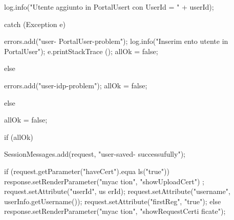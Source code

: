 \begin{DoxyCode}
{{{{{{{                                                                log.info("Utente 
      aggiunto in PortalUsert con UserId = "
                                                                                +
       userId);

                                                        } catch (Exception e) {

                                                                errors.add("user-
      PortalUser-problem");
                                                                log.info("Inserim
      ento utente in PortalUser");
                                                                e.printStackTrace
      ();
                                                                allOk = false;
                                                        }
                                                }
                                        } else {

                                                errors.add("user-idp-problem");
                                                allOk = false;

                                        }

                                } else {

                                        allOk = false;
                                }

                                if (allOk) {

                                        SessionMessages.add(request, "user-saved-
      successufully");

                                        if (request.getParameter("haveCert").equa
      ls("true")) {
                                                response.setRenderParameter("myac
      tion",
                                                                "showUploadCert")
      ;
                                                request.setAttribute("userId", us
      erId);
                                                request.setAttribute("username", 
      userInfo.getUsername());
                                                request.setAttribute("firstReg", 
      "true");
                                        } else {
                                                response.setRenderParameter("myac
      tion",
                                                                "showRequestCerti
      ficate");
                                        }

}}}}
\end{DoxyCode}
